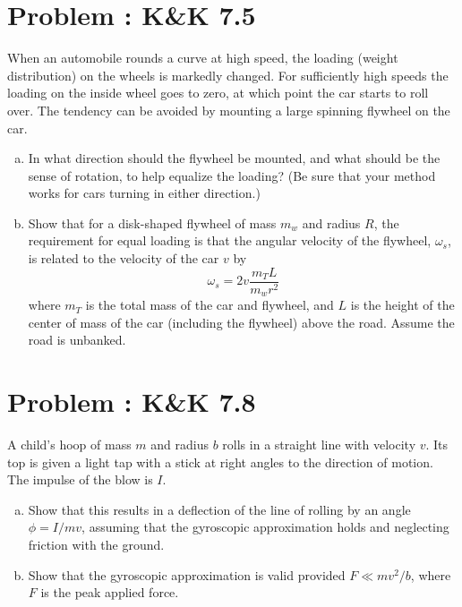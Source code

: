 \documentclass[problems]{esg8012pset}
\begin{document}
\section{Problem \thesection: K\&K 7.5}
  When an automobile rounds a curve at high speed, the loading (weight distribution) on the wheels is markedly changed. For sufficiently high speeds the loading on the inside wheel goes to zero, at which point the car starts to roll over. The tendency can be avoided by mounting a large spinning flywheel on the car.
  \begin{enumerate}[(a)]
    \item In what direction should the flywheel be mounted, and what should be the sense of rotation, to help equalize the loading? (Be sure that your method works for cars turning in either direction.)
    \item Show that for a disk-shaped flywheel of mass $m_w$ and radius $R$, the requirement for equal loading is that the angular velocity of the flywheel, $\omega_s$, is related to the velocity of the car $v$ by $$\omega_s = 2v\frac{m_T L}{m_w r^2}$$ where $m_T$ is the total mass of the car and flywheel, and $L$ is the height of the center of mass of the car (including the flywheel) above the road. Assume the road is unbanked.
  \end{enumerate}
\section{Problem \thesection: K\&K 7.8}
  A child's hoop of mass $m$ and radius $b$ rolls in a straight line with velocity $v$. Its top is given a light tap with a stick at right angles to the direction of motion. The impulse of the blow is $I$.
  \begin{enumerate}[(a)]
    \item Show that this results in a deflection of the line of rolling by an angle $\phi = I / m v$, assuming that the gyroscopic approximation holds and neglecting friction with the ground.
    \item Show that the gyroscopic approximation is valid provided $F \ll mv^2 / b$, where $F$ is the peak applied force.
  \end{enumerate}
\end{document}
